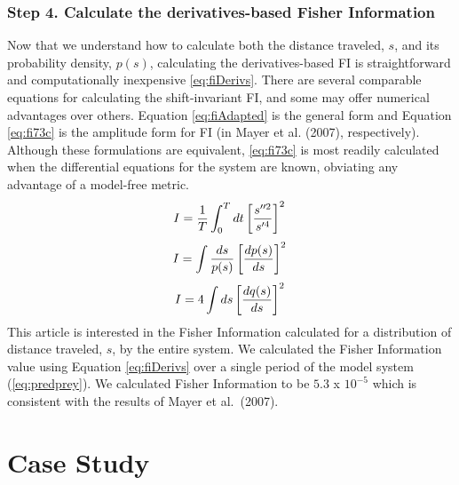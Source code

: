 \documentclass[12pt,twoside,openany]{reedthesis}
\begin{document}
\hypertarget{step-4.-calculate-the-derivatives-based-fisher-information}{%
\subsubsection{\texorpdfstring{\textbf{Step 4.} Calculate the derivatives-based Fisher Information}{Step 4. Calculate the derivatives-based Fisher Information}}\label{step-4.-calculate-the-derivatives-based-fisher-information}}

Now that we understand how to calculate both the distance traveled, \(s\), and its probability density, \(p(s)\), calculating the derivatives-based FI is straightforward and computationally inexpensive \eqref{eq:fiDerivs}. There are several comparable equations for calculating the shift-invariant FI, and some may offer numerical advantages over others. Equation \eqref{eq:fiAdapted} is the general form and Equation \eqref{eq:fi73c} is the amplitude form for FI (in Mayer et al. (2007), respectively). Although these formulations are equivalent, \eqref{eq:fi73c} is most readily calculated when the differential equations for the system are known, obviating any advantage of a model-free metric.
\begin{equation}   
    I = \frac{1}{T} \int_0^T dt\left[\frac{s''^2}{s'^4}\right]^2 \\  
  \label{eq:fiDerivs}  
\end{equation}
\begin{equation} 
    I = \int \frac{ds}{p(s)}\left[\frac{dp(s)}{ds}\right]^2  \\
    \label{eq:fiAdapted}
\end{equation}
\begin{equation} 
    I = 4 \int ds\left[\frac{dq(s)}{ds}\right]^2 \\
\label{eq:fi73c}
\end{equation}
This article is interested in the Fisher Information calculated for a distribution of distance traveled, \(s\), by the entire system. We calculated the Fisher Information value using Equation \eqref{eq:fiDerivs} over a single period of the model system (\eqref{eq:predprey}). We calculated Fisher Information to be \(5.3\) x \(10^{-5}\) which is consistent with the results of Mayer et al.~(2007).

\hypertarget{case-study}{%
\section{Case Study}\label{case-study}}
\end{document}
